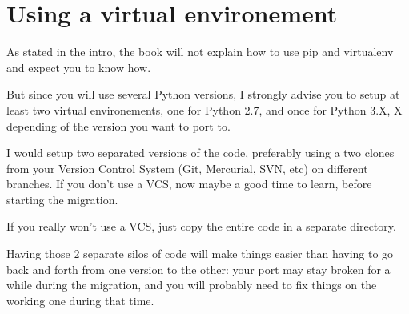 \section{Using a virtual environement}

As stated in the intro, the book will not explain how to use pip and virtualenv and expect you to know how.

But since you will use several Python versions, I strongly advise you to setup at least two virtual environements, one for Python 2.7, and once for Python 3.X, X depending of the version you want to port to.

I would setup two separated versions of the code, preferably using a two clones from your Version Control System (Git, Mercurial, SVN, etc) on different branches. If you don't use a VCS, now maybe a good time to learn, before starting the migration.

If you really won't use a VCS, just copy the entire code in a separate directory.

Having those 2 separate silos of code  will make things easier than having to go back and forth from one version to the other: your port may stay broken for a while during the migration, and you will probably need to fix things on the working one during that time.
